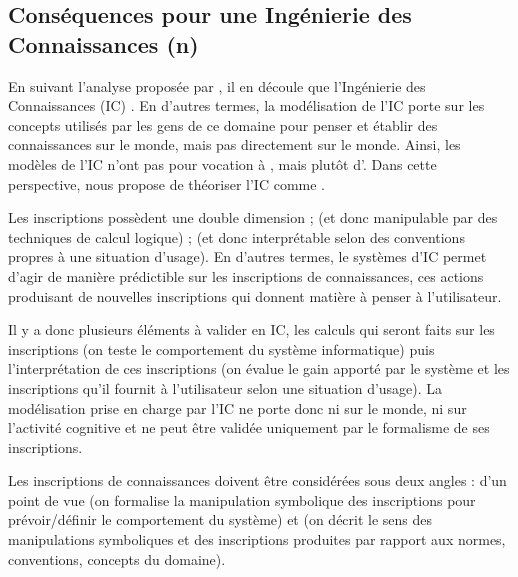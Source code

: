 \subsection{Conséquences pour une Ingénierie des Connaissances (n)}
En suivant l'analyse proposée par \cite{Bachimont2004}, il en découle que  l'Ingénierie des Connaissances (IC) . 
En d'autres termes, la modélisation de l'IC porte sur les concepts utilisés par les gens de ce domaine pour penser et établir des connaissances sur le monde, mais pas directement sur le monde.
Ainsi, les modèles de l'IC n'ont pas pour vocation à , mais plutôt d'. 
Dans cette perspective, \citeauthor{Bachimont2004} nous propose de théoriser l'IC comme . 
        
Les inscriptions possèdent une double dimension ;  (et donc manipulable par des techniques de calcul logique) ;  (et donc interprétable selon des conventions propres à une situation d'usage).  
En d'autres termes, le systèmes d'IC permet d'agir de manière prédictible sur les inscriptions de connaissances, ces actions produisant de nouvelles inscriptions qui donnent matière à penser à l'utilisateur. 
        
Il y a donc plusieurs éléments à valider en IC, les calculs qui seront faits sur les inscriptions (on teste le comportement du système informatique) puis l'interprétation de ces inscriptions (on évalue le gain apporté par le système et les inscriptions qu'il fournit à l'utilisateur selon une situation d'usage). 
La modélisation prise en charge par l'IC ne porte donc ni sur le monde, ni sur l'activité cognitive et ne peut être validée uniquement par le formalisme de ses inscriptions. 
        
Les inscriptions de connaissances doivent être considérées sous deux angles : d'un point de vue  (on formalise la manipulation symbolique des inscriptions pour prévoir/définir le comportement du système) et  (on décrit le sens des manipulations symboliques et des inscriptions produites par rapport aux normes, conventions, concepts du domaine).









